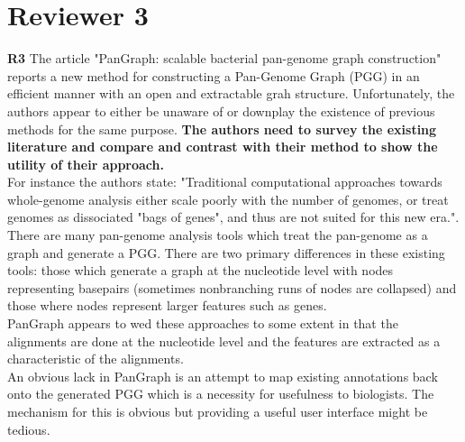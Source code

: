 \documentclass{article}
\newcommand{\review}[1]{\textbf{#1}}
\begin{document}
\section*{Reviewer 3}

\review{R3} The article "PanGraph: scalable bacterial pan-genome graph construction" reports a new method for constructing a Pan-Genome Graph (PGG) in an efficient manner with an open and extractable grah structure. Unfortunately, the authors appear to either be unaware of or downplay the existence of previous methods for the same purpose.\textbf{ The authors need to survey the existing literature and compare and contrast with their method to show the utility of their approach.}\\

For instance the authors state: "Traditional computational approaches towards whole-genome analysis either scale poorly with the number of genomes, or treat genomes as dissociated "bags of genes", and thus are not suited for this new era.". There are many pan-genome analysis tools which treat the pan-genome as a graph and generate a PGG. There are two primary differences in these existing tools: those which generate a graph at the nucleotide level with nodes representing basepairs (sometimes nonbranching runs of nodes are collapsed) and those where nodes represent larger features such as genes.\\
PanGraph appears to wed these approaches to some extent in that the alignments are done at the nucleotide level and the features are extracted as a characteristic of the alignments.\\

An obvious lack in PanGraph is an attempt to map existing annotations back onto the generated PGG which is a necessity for usefulness to biologists. The mechanism for this is obvious but providing a useful user interface might be tedious.\\
\end{document}

